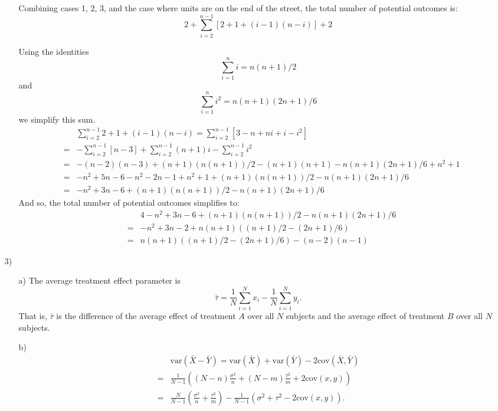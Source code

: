 \documentclass{article}
\newcommand{\var}[0]{\text{var}}
\newcommand{\cov}[0]{\text{cov}}
\begin{document}
\begin{itemize}
\begin{itemize}
      Combining cases 1, 2, 3, and the case where units are on the end of the street,
      the total number of potential outcomes is:
      $$
        2 + \sum_{i=2}^{n-1} [2+1+(i-1)(n-i)] + 2
      $$ 
      
      Using the identities
      $$
        \sum_{i=1}^n i = n(n+1)/2
      $$
      and
      $$
        \sum_{i=1}^n i^2 = n(n+1)(2n+1)/6
      $$
      we simplify this sum.
      \begin{eqnarray*}
      	&&\sum_{i=2}^{n-1} 2+1+(i-1)(n-i)  = \sum_{i=2}^{n-1} [3 - n + ni + i - i^2]   \\&=&
 	- \sum_{i=2}^{n-1} [n- 3] +  \sum_{i=2}^{n-1} (n+1)i -  \sum_{i=2}^{n-1} i^2 \\&=&
	-(n-2)(n-3) + (n+1)(n(n+1))/2 - (n+1)(n+1) - n(n+1)(2n+1)/6 + n^2 +1 \\&=&
	-n^2 + 5n - 6 - n^2 -2n - 1 +n^2 + 1  + (n+1)(n(n+1))/2 - n(n+1)(2n+1)/6\\&=&
	-n^2 + 3n - 6  + (n+1)(n(n+1))/2 - n(n+1)(2n+1)/6
      \end{eqnarray*}
      And so, the total number of potential outcomes simplifies to:
       \begin{eqnarray*}
      	&&4 -n^2 + 3n - 6  + (n+1)(n(n+1))/2 - n(n+1)(2n+1)/6 \\ &=&
	-n^2 + 3n - 2 + n(n+1)((n+1)/2 - (2n+1)/6) \\ &=&
	n(n+1)((n+1)/2 - (2n+1)/6)  -(n-2)(n-1) 	
      \end{eqnarray*}
        \end{itemize}
  \item[3)]
  \begin{itemize}
    \item[a)] The average treatment effect parameter is
      $$
        \bar \tau = \frac 1 N \sum_{i=1}^N x_i - \frac 1 N \sum_{i=1}^N y_i.
      $$
      That is, $\bar \tau$ is the difference of the average effect of treatment $A$ 
      over all $N$ subjects and the average effect of treatment $B$ over all $N$ subjects.  
    \item[b)]
      \begin{align*}
	&\var(\bar X - \bar Y) = \var(\bar X) + \var(\bar Y) - 2\cov(\bar X,\bar Y) \\
	=& \frac 1 {N-1}\left( {(N - n)}\frac{ \sigma^2}n + {(N-m)}\frac{\tau^2}m + 2\cov(x,y)\right)\\
	= &\frac N {N-1}\left(\frac{\sigma^2}{n}+ \frac{\tau^2}{m}\right) - 
	\frac{1}{N-1}(\sigma^2 + \tau^2 - 2\cov(x,y)).
       \end{align*}

\end{itemize}
\end{itemize}
\end{document}
